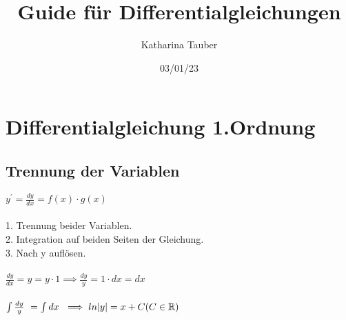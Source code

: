 \documentclass{article}
\begin{document}
\author{Katharina Tauber}
\title{Guide für Differentialgleichungen}

\date{03/01/23}

\maketitle

\section{Differentialgleichung 1.Ordnung}
\subsection{Trennung der Variablen}

$y^{\prime} = \frac{dy}{dx} = f(x) \cdot g(x)$
\\ \\
1. Trennung beider Variablen.
\\
2. Integration auf beiden Seiten der Gleichung.
\\
3. Nach y auflösen.
\\ \\
$\frac{dy}{dx} = y = y \cdot 1 \implies \frac{dy}{y} = 1 \cdot dx = dx$
\\ \\
$\int \frac{dy}{y}\ = \int dx\ \implies ln |y| = x + C \space (C \in \mathbb{R})$
\end{document}
